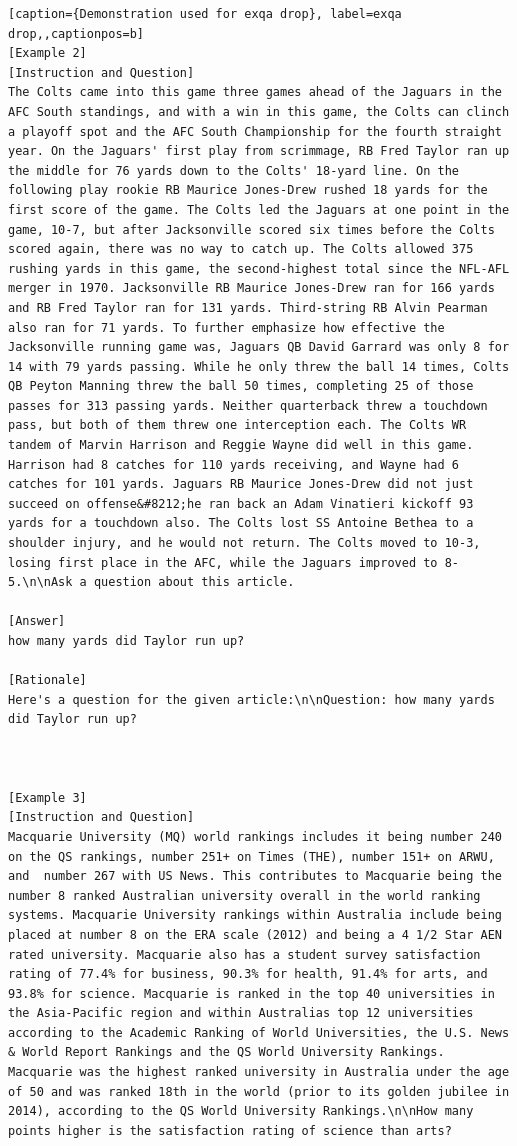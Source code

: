\begin{lstlisting}[caption={Demonstration used for exqa drop}, label=exqa drop,,captionpos=b]
[Example 2]
[Instruction and Question]
The Colts came into this game three games ahead of the Jaguars in the AFC South standings, and with a win in this game, the Colts can clinch a playoff spot and the AFC South Championship for the fourth straight year. On the Jaguars' first play from scrimmage, RB Fred Taylor ran up the middle for 76 yards down to the Colts' 18-yard line. On the following play rookie RB Maurice Jones-Drew rushed 18 yards for the first score of the game. The Colts led the Jaguars at one point in the game, 10-7, but after Jacksonville scored six times before the Colts scored again, there was no way to catch up. The Colts allowed 375 rushing yards in this game, the second-highest total since the NFL-AFL merger in 1970. Jacksonville RB Maurice Jones-Drew ran for 166 yards and RB Fred Taylor ran for 131 yards. Third-string RB Alvin Pearman also ran for 71 yards. To further emphasize how effective the Jacksonville running game was, Jaguars QB David Garrard was only 8 for 14 with 79 yards passing. While he only threw the ball 14 times, Colts QB Peyton Manning threw the ball 50 times, completing 25 of those passes for 313 passing yards. Neither quarterback threw a touchdown pass, but both of them threw one interception each. The Colts WR tandem of Marvin Harrison and Reggie Wayne did well in this game. Harrison had 8 catches for 110 yards receiving, and Wayne had 6 catches for 101 yards. Jaguars RB Maurice Jones-Drew did not just succeed on offense&#8212;he ran back an Adam Vinatieri kickoff 93 yards for a touchdown also. The Colts lost SS Antoine Bethea to a shoulder injury, and he would not return. The Colts moved to 10-3, losing first place in the AFC, while the Jaguars improved to 8-5.\n\nAsk a question about this article.

[Answer]
how many yards did Taylor run up?

[Rationale]
Here's a question for the given article:\n\nQuestion: how many yards did Taylor run up?



[Example 3]
[Instruction and Question] 
Macquarie University (MQ) world rankings includes it being number 240 on the QS rankings, number 251+ on Times (THE), number 151+ on ARWU, and  number 267 with US News. This contributes to Macquarie being the number 8 ranked Australian university overall in the world ranking systems. Macquarie University rankings within Australia include being placed at number 8 on the ERA scale (2012) and being a 4 1/2 Star AEN rated university. Macquarie also has a student survey satisfaction rating of 77.4% for business, 90.3% for health, 91.4% for arts, and 93.8% for science. Macquarie is ranked in the top 40 universities in the Asia-Pacific region and within Australias top 12 universities according to the Academic Ranking of World Universities, the U.S. News & World Report Rankings and the QS World University Rankings. Macquarie was the highest ranked university in Australia under the age of 50 and was ranked 18th in the world (prior to its golden jubilee in 2014), according to the QS World University Rankings.\n\nHow many points higher is the satisfaction rating of science than arts?


\end{lstlisting}

